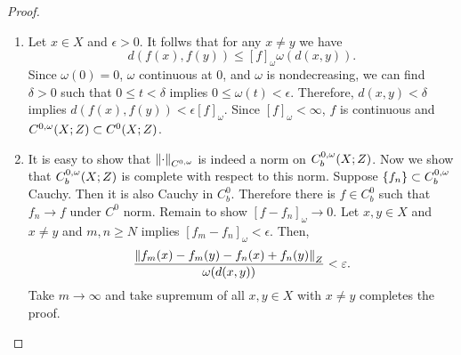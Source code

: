 \documentclass[a4paper]{article}
\begin{document}
{  \begin{proof}
    \begin{enumerate}
      \item Let $x \in X$ and $\epsilon > 0$. It follws that for
            any $x \neq y$ we have
            \[
              d(f(x), f(y)) \leq [f]_\omega \omega(d(x, y)).
            \]
            Since $\omega(0) = 0$, $\omega$ continuous
            at $0$, and $\omega$ is nondecreasing, we can find
            $\delta > 0$ such that $0 \leq t < \delta$ implies
            $0 \leq \omega(t) < \epsilon$.
            Therefore,
            $d(x, y) < \delta$ implies $d(f(x), f(y)) < \epsilon [f]_{\omega}$.
            Since $[f]_{\omega} < \infty$, $f$ is continuous and
            ${C^{0, \omega}} (X; Z) \subset C^0(X; Z)$.

      \item It is easy to show that $\left\lVert \cdot\right\rVert_{{C^{0, \omega}}}$ is indeed a
            norm on ${C^{0, \omega}_b}(X; Z)$. Now we show that ${C^{0, \omega}_b}(X; Z)$
            is complete with respect to this norm.
            Suppose $\left\{ f_n \right\} \subset {C^{0, \omega}_b}$ Cauchy. Then
            it is also Cauchy in $C^0_b$. Therefore there is $f \in C^0_b$
            such that $f_n \to f$ under $C^0$ norm. Remain to show
            $[f - f_n]_\omega \to 0$. Let $x, y \in X$ and $x \neq y$
            and $m, n \geq N$ implies $[f_m - f_n]_\omega < \epsilon$.
            Then,
            \[
              \begin{aligned}
                \frac{\left\lVert f_m(x) - f_m(y) - f_n(x) + f_n(y)\right\rVert_Z}{\omega(d(x, y))}
                < \varepsilon.
              \end{aligned}
            \]
            Take $m \to \infty$ and take supremum of all
            $x, y \in X$ with $x \neq y$
            completes the proof.


    \end{enumerate}
  \end{proof}
}
\end{document}
